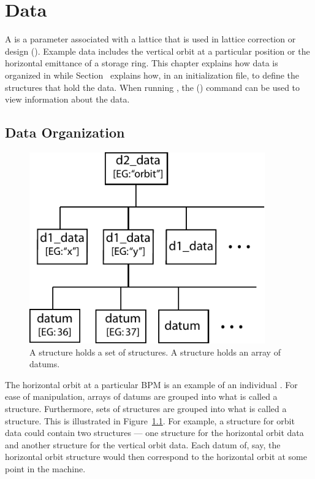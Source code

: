 \chapter{Data}
\label{c:data}

A \tao {} is a parameter associated with a lattice that is used in lattice correction or
design (). Example data includes the vertical orbit at a particular position or the
horizontal emittance of a storage ring. This chapter explains how data is organized in \tao while
Section~ explains how, in an initialization file, to define the structures that
hold the data.  When running \tao, the  () command can be used to view
information about the data.


\section{Data Organization}
\label{s:data.org}

\begin{figure}
  \centering
  \includegraphics[width=4in]{data-tree.pdf}
  \caption[Data tree structure]
{A  structure holds a set of  structures. 
A  structure holds an array of datums.}
  \label{f:data.tree}
\end{figure}

The horizontal orbit at a particular BPM is an example of an
individual .  For ease of manipulation, arrays of datums are
grouped into what is called a  structure. Furthermore,
sets of  structures are grouped into what is called a
 structure.  This is illustrated in
Figure~\ref{f:data.tree}.  For example, a  structure for
orbit data could contain two  structures --- one
 structure for the horizontal orbit data and another
 structure for the vertical orbit data. Each datum of,
say, the horizontal orbit  structure would then correspond
to the horizontal orbit at some point in the machine.

